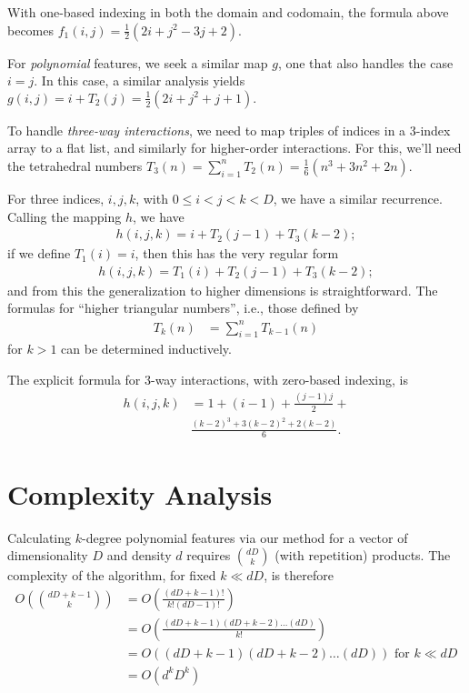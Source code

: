\documentclass{article} %
\begin{document}
With one-based indexing in both the domain and codomain, the formula above becomes
$f_1(i, j)  = \frac{1}{2}(2i + j^2 - 3j + 2).$

For \emph{polynomial} features, we seek a similar map $g$, one that also handles the case $i = j$. In this case, a similar analysis yields
$ g(i, j) = i + T_2(j) = \frac{1}{2} (2i + j^2 + j + 1).$


To handle \emph{three-way interactions}, we need to map triples of indices in a 3-index array to a flat list, and similarly for higher-order interactions. For this, we'll need the tetrahedral numbers $T_3(n) = \sum_{i=1}^n T_{2}(n) = 
\frac{1}{6}(n^3 + 3n^2 + 2n)$.

For three indices, $i,j,k$, with $0 \le i < j < k < D$, we have a similar recurrence. Calling the mapping $h$, we have 
\begin{align}
h(i,j,k) = i + T_2(j-1) + T_3(k-2);
\end{align}
if we define $T_1(i) = i$, then this has the very regular form
\begin{align}
h(i,j,k) =  T_1(i) + T_2(j-1) + T_3(k-2);
\end{align}
and from this the generalization to higher dimensions is straightforward. The formulas for ``higher triangular numbers'', i.e., those defined by
\begin{align}
T_k(n) &= \sum_{i=1}^n T_{k-1}(n)
\end{align}
for $k > 1$ can be determined inductively.

The explicit formula for 3-way interactions, with zero-based indexing, is 
\begin{align}
h(i, j, k) &= 1 + (i-1) + \frac{(j-1)j}{2} + \\
& \frac{(k-2)^3 + 3(k-2)^2 + 2(k-2)}{6}. 
\end{align}

\section{Complexity Analysis}

Calculating $k$-degree polynomial features via our method for a vector of dimensionality $D$ and density $d$ requires $\binom{dD}{k}$ (with repetition) products.
The complexity of the algorithm, for fixed $k \ll dD$, is therefore
\begin{align}
O\left(\binom{dD+k-1}{k}\right) & = O\left(\frac{(dD+k-1)!}{k!(dD-1)!}\right)\\
& = O\left(\frac{(dD+k-1)(dD+k-2) \dots (dD)}{k!}\right)\\
& = O\left((dD+k-1)(dD+k-2) \dots (dD)\right) \mbox{ for } k \ll dD\\
& = O\left(d^kD^k\right)
\end{align}





\end{document}

